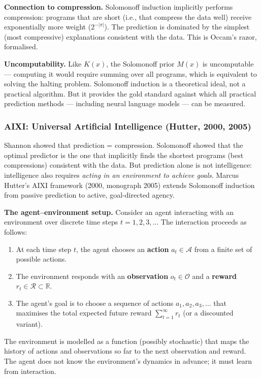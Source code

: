 \documentclass[11pt, a4paper]{article}
\begin{document}
\textbf{Connection to compression.} Solomonoff induction implicitly
performs compression: programs that are short (i.e., that compress the data
well) receive exponentially more weight ($2^{-|\pi|}$). The prediction is
dominated by the simplest (most compressive) explanations consistent with
the data. This is Occam's razor, formalised.

\textbf{Uncomputability.} Like $K(x)$, the Solomonoff prior $M(x)$ is
uncomputable --- computing it would require summing over all programs,
which is equivalent to solving the halting problem. Solomonoff induction
is a theoretical ideal, not a practical algorithm. But it provides the
gold standard against which all practical prediction methods ---
including neural language models --- can be measured.


\subsubsection{AIXI: Universal Artificial Intelligence (Hutter, 2000, 2005)}

Shannon showed that prediction = compression. Solomonoff showed that the
optimal predictor is the one that implicitly finds the shortest programs
(best compressions) consistent with the data. But prediction alone is not
intelligence: intelligence also requires \emph{acting in an environment to
achieve goals}. Marcus Hutter's AIXI framework (2000, monograph 2005)
extends Solomonoff induction from passive prediction to active,
goal-directed agency.

\textbf{The agent--environment setup.} Consider an agent interacting with
an environment over discrete time steps $t = 1, 2, 3, \ldots$ The
interaction proceeds as follows:
\begin{enumerate}[leftmargin=2em]
  \item At each time step $t$, the agent chooses an \textbf{action}
    $a_t \in \mathcal{A}$ from a finite set of possible actions.
  \item The environment responds with an \textbf{observation}
    $o_t \in \mathcal{O}$ and a \textbf{reward}
    $r_t \in \mathcal{R} \subset \mathbb{R}$.
  \item The agent's goal is to choose a sequence of actions
    $a_1, a_2, a_3, \ldots$ that maximises the total expected
    future reward $\sum_{t=1}^{\infty} r_t$ (or a discounted variant).
\end{enumerate}
The environment is modelled as a function (possibly stochastic) that maps
the history of actions and observations so far to the next observation and
reward. The agent does not know the environment's dynamics in advance; it
must learn from interaction.
\end{document}
